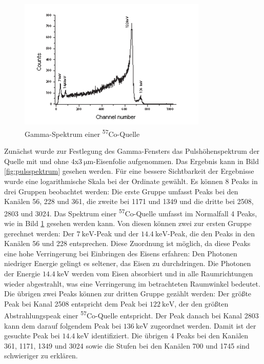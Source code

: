 \documentclass[german, %
parskip=full, %
bibliography=totoc, %
]{scrartcl}
\begin{document}
\begin{figure}[hb] 
  \centering
     \includegraphics[width=0.8\textwidth]{CoSpektrum}
  \caption{Gamma-Spektrum einer \textsuperscript{57}Co-Quelle}
  \label{fig:spektrumco}
\end{figure}

Zunächst wurde zur Festlegung des Gamma-Fensters das Pulshöhenspektrum der Quelle mit und ohne 4x\(\SI{3}{\micro\meter}\)-Eisenfolie aufgenommen. Das Ergebnis kann in Bild \ref{fig:pulsspektrum} gesehen werden. Für eine bessere Sichtbarkeit der Ergebnisse wurde eine logarithmische Skala bei der Ordinate gewählt. Es können 8 Peaks in drei Gruppen beobachtet werden: Die erste Gruppe umfasst Peaks bei den Kanälen 56, 228 und 361, die zweite bei 1171 und 1349 und die dritte bei 2508, 2803 und 3024. Das Spektrum einer \textsuperscript{57}Co-Quelle umfasst im Normalfall 4 Peaks, wie in Bild \ref{fig:spektrumco} gesehen werden kann. Von diesen können zwei zur ersten Gruppe gerechnet werden: Der \(\SI{7}{\kilo\electronvolt}\)-Peak und der \(\SI{14.4}{\kilo\electronvolt}\)-Peak, die den Peaks in den Kanälen 56 und 228 entsprechen. Diese Zuordnung ist möglich, da diese Peaks eine hohe Verringerung bei Einbringen des Eisens erfahren: Den Photonen niedriger Energie gelingt es seltener, das Eisen zu durchdringen. Die Photonen der Energie \(\SI{14.4}{\kilo\electronvolt}\) werden vom Eisen absorbiert und in alle Raumrichtungen wieder abgestrahlt, was eine Verringerung im betrachteten Raumwinkel bedeutet. Die übrigen zwei Peaks können zur dritten Gruppe gezählt werden: Der größte Peak bei Kanal 2508 entspricht dem Peak bei \(\SI{122}{\kilo\electronvolt}\), der den größten Abstrahlungspeak einer \textsuperscript{57}Co-Quelle entspricht. Der Peak danach bei Kanal 2803 kann dem darauf folgendem Peak bei \(\SI{136}{\kilo\electronvolt}\) zugeordnet werden. Damit ist der gesuchte Peak bei \(\SI{14.4}{\kilo\electronvolt}\) identifiziert. Die übrigen 4 Peaks bei den Kanälen 361, 1171, 1349 und 3024 sowie die Stufen bei den Kanälen 700 und 1745 sind schwieriger zu erklären.
\end{document}
